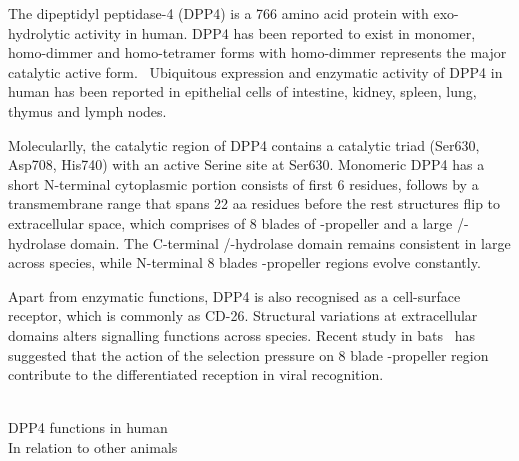 The dipeptidyl peptidase-4 (DPP4) is a 766 amino acid protein with exo-hydrolytic activity in human. DPP4 has been reported to exist in  monomer, homo-dimmer and homo-tetramer forms  with homo-dimmer represents the major catalytic active form.~\cite{Mulvihill_2014} Ubiquitous expression and enzymatic activity of DPP4 in human has been reported in epithelial cells of intestine, kidney, spleen, lung, thymus and lymph nodes. 

Molecularlly, the catalytic region of DPP4 contains a catalytic triad (Ser630, Asp708, His740) with an active Serine site at Ser630. Monomeric DPP4 has a short N-terminal cytoplasmic portion consists of first 6 residues, follows by a transmembrane range that spans 22 aa residues before the rest structures flip to extracellular space, which comprises of 8 blades of \beta-propeller and a large \alpha/\beta-hydrolase domain. The C-terminal \alpha/\beta-hydrolase domain remains consistent in large across species, while N-terminal 8 blades \beta-propeller regions evolve constantly. 

Apart from enzymatic functions, DPP4 is also recognised as a cell-surface receptor, which is commonly as CD-26. Structural variations at extracellular domains alters signalling functions across species. Recent study in bats~\cite{Letko_2018, Cui_2013} has suggested that the action of the selection pressure on 8 blade \beta-propeller region contribute to the differentiated reception in viral recognition.  

\\
DPP4 functions in human 
\\ 
In relation to other animals 


